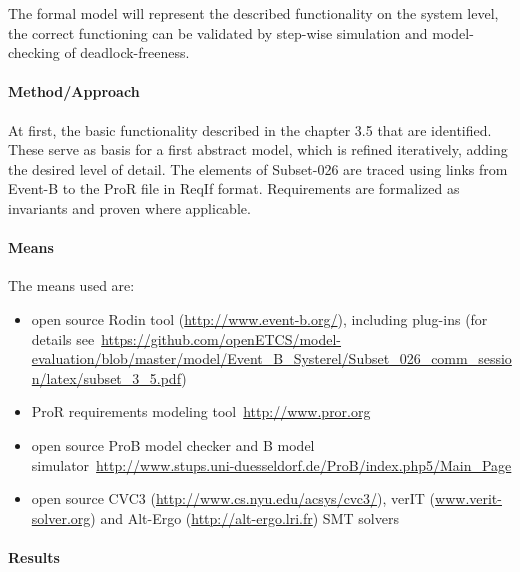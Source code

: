 The formal model will represent the described functionality on the system level,
the correct functioning can be validated by step-wise simulation and
model-checking of deadlock-freeness.


\paragraph{Method/Approach}
\label{sec:methodapproach}

At first, the basic functionality described in the chapter 3.5 that are
identified. These serve as basis for a first abstract model, which is refined
iteratively, adding the desired level of detail. The elements of Subset-026 are
traced using links from Event-B to the ProR file in ReqIf format. Requirements
are formalized as invariants and proven where applicable.

\paragraph{Means}
\label{sec:means}

The means used are:
\begin{itemize}
\item open source Rodin tool (\url{http://www.event-b.org/}), including plug-ins
  (for details
  see~\url{https://github.com/openETCS/model-evaluation/blob/master/model/Event_B_Systerel/Subset_026_comm_session/latex/subset_3_5.pdf})
\item ProR requirements modeling tool~\url{http://www.pror.org}
\item open source ProB model checker and B model
  simulator~\url{http://www.stups.uni-duesseldorf.de/ProB/index.php5/Main_Page}
\item open source CVC3 (\url{http://www.cs.nyu.edu/acsys/cvc3/}), verIT
  (\url{www.verit-solver.org}) and Alt-Ergo (\url{http://alt-ergo.lri.fr}) SMT
  solvers
\end{itemize}



\paragraph{Results}
\label{sec:results}


